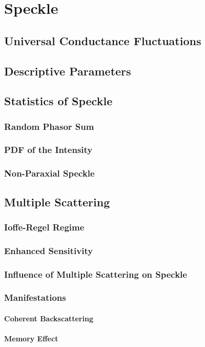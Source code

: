 \documentclass[a4paper,titlepage,onecolumn]{report}
\begin{document}
\chapter{Speckle} \label{ch:speckle}
 \section{Universal Conductance Fluctuations}
 \section{Descriptive Parameters}
 \section{Statistics of Speckle}
  \subsection{Random Phasor Sum}
  \subsection{PDF of the Intensity}
  \subsection{Non-Paraxial Speckle}
 \section{Multiple Scattering}
  \subsection{Ioffe-Regel Regime}
  \subsection{Enhanced Sensitivity}
  \subsection{Influence of Multiple Scattering on Speckle}
  \subsection{Manifestations}
   \subsubsection{Coherent Backscattering}
   \subsubsection{Memory Effect}
\end{document}
